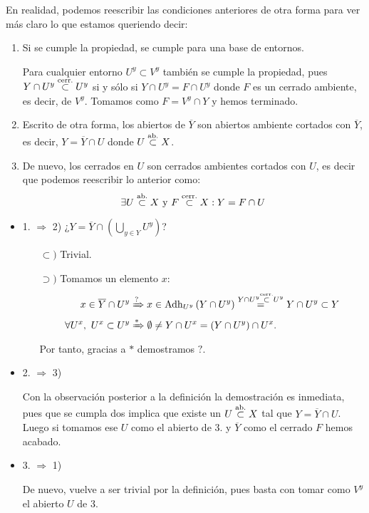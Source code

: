 \begin{obs}
En realidad, podemos reescribir las condiciones anteriores de otra forma para ver más claro lo que estamos queriendo decir:
\begin{enumerate}
\item Si se cumple la propiedad, se cumple para una base de entornos.

Para cualquier entorno $U^y \subset V^y$ también se cumple la propiedad, pues $Y\cap U^y \stackrel{\text{cerr.}}{\subset} U^y$ si y sólo si $Y\cap U^y = F \cap U^y$ donde $F$ es un cerrado ambiente, es decir, de $V^y$. Tomamos como $F = V^y \cap Y$ y hemos terminado. 

\item Escrito de otra forma, los abiertos de $\overline{Y}$ son abiertos ambiente cortados con $\overline{Y}$, es decir, $Y = \overline{Y} \cap U$ donde $U \stackrel{\text{ab.}}{\subset} X$.

\item De nuevo, los cerrados en $U$ son cerrados ambientes cortados con $U$, es decir que podemos reescribir lo anterior como:
\[
\exists U \stackrel{\text{ab.}}{\subset} X \mbox{ y } F\stackrel{\text{cerr.}}{\subset} X : Y = F \cap U
\]
\end{enumerate}
\end{obs}

\begin{demo}
\begin{itemize}
    \item 1. $\Rightarrow$ 2) ¿$Y = \overline{Y} \cap \left( \bigcup_{y \in Y} U^y \right)$?
    \begin{itemize}
        \item[$\subset)$] Trivial.
        \item[$\supset)$] Tomamos un elemento $x$:
            \begin{align*}
                x \in \overline{Y} \cap U^y &\xRightarrow{?} x \in \operatorname{Adh}_{U^y} \left( Y \cap U^y \right) \stackrel{Y \cap U^y \stackrel{\text{cerr.}}{\subset} U^y}{=} Y \cap U^y \subset Y\\
                \forall U^x,\ U^x \subset U^y &\xRightarrow{*} \emptyset \neq Y \cap U^x = \left( Y \cap U^y \right) \cap U^x
            .\end{align*}
            Por tanto, gracias a $*$ demostramos $?$.
    \end{itemize}
    \item 2. $\Rightarrow$ 3) 
	
	Con la observación posterior a la definición la demostración es inmediata, pues que se cumpla dos implica que existe un $U \stackrel{\text{ab.}}{\subset} X$ tal que $Y = \overline{Y} \cap U$. Luego si tomamos ese $U$ como el abierto de 3. y $\overline{Y}$ como el cerrado $F$ hemos acabado.
	
    \item 3. $\Rightarrow$ 1)
    
    De nuevo, vuelve a ser trivial por la definición, pues basta con tomar como $V^y$ el abierto $U$ de 3.
\end{itemize}
\end{demo}

